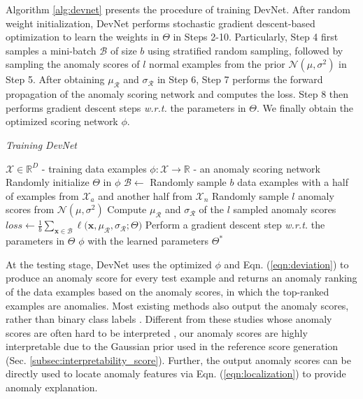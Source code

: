 \documentclass[10pt,journal,compsoc]{IEEEtran}
\begin{document}
Algorithm \ref{alg:devnet} presents the procedure of training DevNet. After random weight initialization, DevNet performs stochastic gradient descent-based optimization to learn the weights in $\Theta$ in Steps 2-10. Particularly, Step 4 first samples a mini-batch $\mathcal{B}$ of size $b$ using stratified random sampling, followed by sampling the anomaly scores of $l$ normal examples from the prior $\mathcal{N}(\mu, \sigma^2)$ in Step 5. After obtaining $\mu_{\mathcal{R}}$ and $\sigma_{\mathcal{R}}$ in Step 6, Step 7 performs the forward propagation of the anomaly scoring network and computes the loss. Step 8 then performs gradient descent steps \textit{w.r.t.} the parameters in $\Theta$. We finally obtain the optimized scoring network $\phi$.

\renewcommand{\algorithmicrequire}{\textbf{Input:}}
\renewcommand{\algorithmicensure}{\textbf{Output:}}
\begin{algorithm}[t]
\small 
\caption{\textit{Training DevNet}}
\begin{algorithmic}[1]
\label{alg:devnet}
\REQUIRE $\mathcal{X} \in \mathbb{R}^{D}$ - training data examples
\ENSURE $\phi: \mathcal{X} \rightarrow \mathbb{R}$ - an anomaly scoring network
\STATE Randomly initialize $\Theta$ in $\phi$
        \STATE $\mathcal{B} \leftarrow$ Randomly sample $\mathit{b}$ data examples with a half of examples from $\mathcal{X}_a$ and another half from $\mathcal{X}_n$
        \STATE Randomly sample $l$ anomaly scores from $\mathcal{N}(\mu, \sigma^2)$
        \STATE Compute $\mu_{\mathcal{R}}$ and $\sigma_{\mathcal{R}}$ of the $l$ sampled anomaly scores
\STATE $\mathit{loss} \leftarrow \frac{1}{b}\sum_{\mathbf{x} \in \mathcal{B}}\ell\big(\mathbf{x}, \mu_{\mathcal{R}}, \sigma_{\mathcal{R}};\Theta \big)$    
        \STATE Perform a gradient descent step \textit{w.r.t.} the parameters in $\Theta$
    \ENDFOR
\ENDFOR
\RETURN $\phi$ with the learned parameters $\Theta^*$
\end{algorithmic}
\end{algorithm}


At the testing stage, DevNet uses the optimized $\phi$ and Eqn. (\ref{eqn:deviation}) to produce an anomaly score for every test example and returns an anomaly ranking of the data examples based on the anomaly scores, in which the top-ranked examples are anomalies. Most existing methods also output the anomaly scores, rather than binary class labels \cite{chandola2009anomaly,pang2021deep}. Different from these studies whose anomaly scores are often hard to be interpreted \cite{kriegel2011interpreting}, our anomaly scores are highly interpretable due to the Gaussian prior used in the reference score generation (Sec. \ref{subsec:interpretability_score}). Further, the output anomaly scores can be directly used to locate anomaly features via Eqn. (\ref{eqn:localization}) to provide anomaly explanation.
\end{document}
